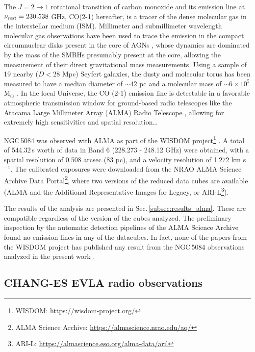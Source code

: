 \documentclass[modern]{CORE-AAS/aastex631}
\begin{document}
The $J = 2 \rightarrow 1$ rotational transition of carbon monoxide and its emission line at $\nu_{\rm rest} = 230.538$ GHz, CO(2-1) hereafter, is a tracer of the dense molecular gas in the interstellar medium (ISM). Millimeter and submillimeter wavelength molecular gas observations have been used to trace the emission in the compact circumnuclear disks present in the core of AGNs \citep{garciaburillo+2021aap652_98}, whose dynamics are dominated by the mass of the SMBHs presumably present at the core, allowing the measurement of their direct gravitational mass \citep{davis+2013nat494_328,onishi+2015apj806_39} measurements. Using a sample of 19 nearby ($D<28$ Mpc) Seyfert galaxies, the dusty and molecular torus has been measured to have a median diameter of $\sim42$ pc and a molecular mass of $\sim6\times10^{5}$ M$_{\odot}$ \citep{garciaburillo+2021aap652_98}. In the local Universe, the CO (2-1) emission line is detectable in a favorable atmospheric transmission window for ground-based radio telescopes like the Atacama Large Millimeter Array (ALMA) Radio Telescope \citep{leroy+2021apj257_43}, allowing for extremely high sensitivities and spatial resolution…

NGC\,5084 was observed with ALMA as part of the WISDOM project\footnote{WISDOM: \url{https://wisdom-project.org/}} \citep[Project code: 2015.1.00598.S, PI: Martin Bureau,][]{onishi+2017mnras468_4663}. A total of 544.32\,s worth of data in Band 6 (228.273 - 248.12 GHz) were obtained, with a spatial resolution of 0.508 arcsec (83 pc), and a velocity resolution of 1.272 km s$^{-1}$. The calibrated exposures were downloaded from the NRAO ALMA Science Archive Data Portal\footnote{ALMA Science Archive: \url{https://almascience.nrao.edu/aq/}}, where two versions of the reduced data cubes are available (ALMA and the Additional Representative Images for Legacy, or ARI-L\footnote{ARI-L: \url{https://almascience.eso.org/alma-data/aril}}).

The results of the analysis are presented in Sec.\,\ref{subsec:results_alma}. These are compatible regardless of the version of the cubes analyzed. The preliminary inspection by the automatic detection pipelines of the ALMA Science Archive found no emission lines in any of the datacubes. In fact, none of the papers from the WISDOM project has published any result from the NGC\,5084 observations analyzed in the present work \citep{smith+2021mnras500_1933, davis+2022mnras512_1522}. 


\subsection{CHANG-ES EVLA radio observations} \label{subsec:data_radiopol}
\end{document}

